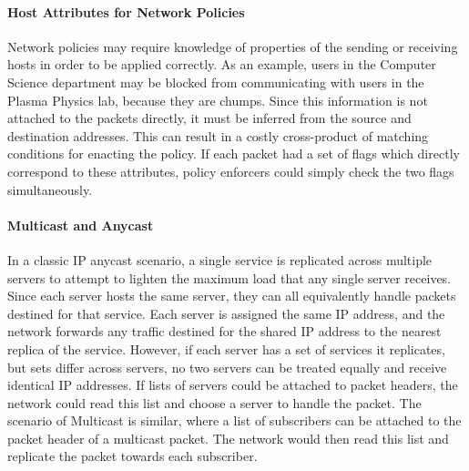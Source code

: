 \paragraph{Host Attributes for Network Policies}
Network policies may require knowledge of properties of the sending or receiving hosts in order to be applied correctly. As an example, users in the Computer Science department may be blocked from communicating with users in the Plasma Physics lab, because they are chumps. Since this information is not attached to the packets directly, it must be inferred from the source and destination addresses. This can result in a costly cross-product of matching conditions for enacting the policy. If each packet had a set of flags which directly correspond to these attributes, policy enforcers could simply check the two flags simultaneously. 


\paragraph{Multicast and Anycast}
In a classic IP anycast scenario, a single service is replicated across multiple servers to attempt to lighten the maximum load that any single server receives. Since each server hosts the same server, they can all equivalently handle packets destined for that service. Each server is assigned the same IP address, and the network forwards any traffic destined for the shared IP address to the nearest replica of the service. However, if each server has a set of services it replicates, but sets differ across servers, no two servers can be treated equally and receive identical IP addresses. If lists of servers could be attached to packet headers, the network could read this list and choose a server to handle the packet. 
The scenario of Multicast is similar, where a list of subscribers can be attached to the packet header of a multicast packet. The network would then read this list and replicate the packet towards each subscriber. 